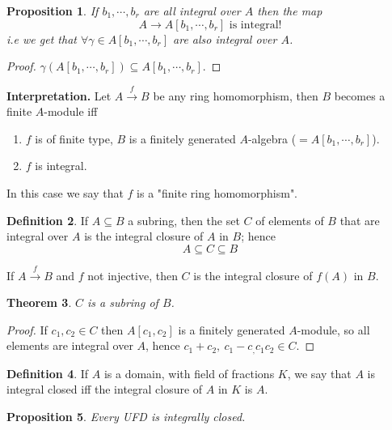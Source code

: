 \documentclass[11pt,a4paper]{article}
\theoremstyle{definition}
\newtheorem{definition}{Definition}[section]
\theoremstyle{plain}
\newtheorem{theorem}[definition]{Theorem}
\newtheorem{proposition}[definition]{Proposition}
\theoremstyle{remark}
\begin{document}
\begin{proposition}
    If $b_1, \cdots, b_r$ are all integral over $A$ then the map 
    $$A \to A[b_1, \cdots, b_r] \text{ is integral!}$$
    i.e we get that $\forall \gamma \in A[b_1, \cdots, b_r]$ are also integral over $A$. 
\end{proposition}

\begin{proof}
    $\gamma (A[b_1, \cdots, b_r]) \subseteq A[b_1, \cdots, b_r]$. 
\end{proof}

\textbf{Interpretation.} Let $A \xrightarrow{f} B$ be any ring homomorphism, then $B$ becomes a finite $A$-module iff 
\begin{enumerate}
    \item $f$ is of finite type, $B$ is a finitely generated $A$-algebra ($= A[b_1, \cdots, b_r]$). 
    \item $f$ is integral.
\end{enumerate}
In this case we say that $f$ is a "finite ring homomorphism". 

\begin{definition}
    If $A \subseteq B$ a subring, then the set $C$ of elements of $B$ that are integral over $A$ is the 
    integral closure of $A$ in $B$; hence 
    $$A \subseteq C \subseteq B$$
    
    If $A \xrightarrow{f} B$ and $f$ not injective, then $C$ is the integral closure of $f(A)$ in $B$. 
\end{definition}

\begin{theorem}
    $C$ is a subring of $B$.
\end{theorem}

\begin{proof}
    If $c_1, c_2 \in C$ then $A[c_1, c_2]$ is a finitely generated $A$-module, so all elements are 
    integral over $A$, hence $c_1 + c_2, \ c_1 - c_, c_1 c_2 \in C$. 
\end{proof}

\begin{definition}
    If $A$ is a domain, with field of fractions $K$, we say that $A$ is integral closed iff 
    the integral closure of $A$ in $K$ is $A$. 
\end{definition}

\begin{proposition}
    Every UFD is integrally closed. 
\end{proposition}
\end{document}
